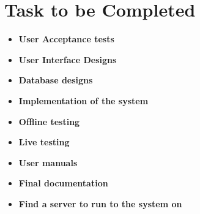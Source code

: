 \documentclass[12pt]{article}
\begin{document}
\begin{center}
\begin{tabular}{|p{3cm}|p{3cm}|p{9cm}|}
\end{tabular}
\end{center}
\section{Task to be Completed}

\begin{itemize}
\item \textbf{User Acceptance tests}
\item \textbf{User Interface Designs}
\item \textbf{Database designs}
\item \textbf{Implementation of the system}
\item \textbf{Offline testing}
\item \textbf{Live testing}
\item \textbf{User manuals}
\item \textbf{Final documentation}
\item \textbf{Find a server to run to the system on}


\end{itemize}
\end{document}
